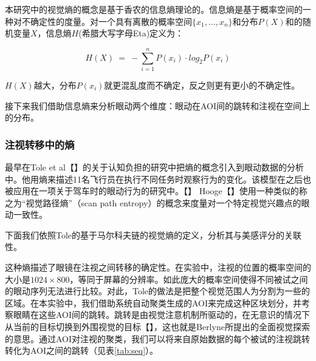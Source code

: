 本研究中的视觉熵的概念是基于香农的信息熵理论的。信息熵是基于概率空间的一种对不确定性的度量。对一个具有离散的概率空间$\{x_1, ..., x_n\}$和分布$P(X)$和的随机变量$X$，信息熵$H$(希腊大写字母Eta)定义为：

$$H(X)~=~-\sum_{i=1}^n P(x_i)\cdot log_{2}P(x_i)$$

$H(X)$越大，分布$P(x_i)$就更混乱度而不确定，反之则更有更小的不确定性。

接下来我们借助信息熵来分析眼动两个维度：眼动在AOI间的跳转和注视在空间上的分布。

\subsubsection{注视转移中的熵}
最早在Tole et al【】的关于认知负担的研究中把熵的概念引入到眼动数据的分析中。他用熵来描述11名飞行员在执行不同任务时观察行为的变化。该模型在之后也被应用在一项关于驾车时的眼动行为的研究中。【】
Hooge【】使用一种类似的称之为“视觉路径熵”（scan path entropy）的概念来度量对一个特定视觉兴趣点的眼动一致性。

下面我们依照Tole的基于马尔科夫链的视觉熵的定义，分析其与美感评分的关联性。

这种熵描述了眼镜在注视之间转移的确定性。在实验中，注视的位置的概率空间的大小是$1024\times800$，等同于屏幕的分辨率。如此庞大的概率空间使得不同被试之间的眼动序列无法进行比较。对此，Tole的做法是把整个视觉范围人为分割为一些的区域。在本实验中，我们借助系统自动聚类生成的AOI来完成这种区块划分，并考察眼睛在这些AOI间的跳转。跳转是由视觉注意机制所驱动的，在无意识的情况下从当前的目标切换到外围视觉的目标【】，这也就是Berlyne所提出的全面视觉探索的意思。通过AOI对注视的聚类，我们可以将来自原始数据的每个被试的注视跳转转化为AOI之间的跳转（见表\ref{tab:seq}）。

